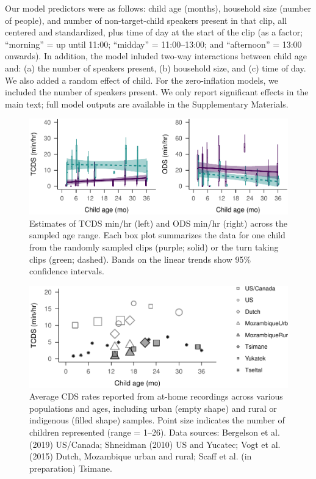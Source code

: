 \documentclass[floatsintext,man]{apa6}
\theoremstyle{definition}
\theoremstyle{definition}
\theoremstyle{definition}
\theoremstyle{remark}
\begin{document}
Our model predictors were as follows: child age (months), household size
(number of people), and number of non-target-child speakers present in
that clip, all centered and standardized, plus time of day at the start
of the clip (as a factor; \enquote{morning} = up until 11:00;
\enquote{midday} = 11:00--13:00; and \enquote{afternoon} = 13:00
onwards). In addition, the model inluded two-way interactions between
child age and: (a) the number of speakers present, (b) household size,
and (c) time of day. We also added a random effect of child. For the
zero-inflation models, we included the number of speakers present. We
only report significant effects in the main text; full model outputs are
available in the Supplementary Materials.

\begin{figure}
\centering
\includegraphics{Tseltal-CLE_files/figure-latex/fig3-1.pdf}
\caption{\label{fig:fig3}Estimates of TCDS min/hr (left) and ODS min/hr
(right) across the sampled age range. Each box plot summarizes the data
for one child from the randomly sampled clips (purple; solid) or the
turn taking clips (green; dashed). Bands on the linear trends show 95\%
confidence intervals.}
\end{figure}

\begin{figure}
\centering
\includegraphics{Tseltal-CLE_files/figure-latex/fig4-1.pdf}
\caption{\label{fig:fig4}Average CDS rates reported from at-home recordings
across various populations and ages, including urban (empty shape) and
rural or indigenous (filled shape) samples. Point size indicates the
number of children represented (range = 1--26). Data sources: Bergelson
et al. (2019) US/Canada; Shneidman (2010) US and Yucatec; Vogt et al.
(2015) Dutch, Mozambique urban and rural; Scaff et al. (in preparation)
Tsimane.}
\end{figure}
\end{document}
